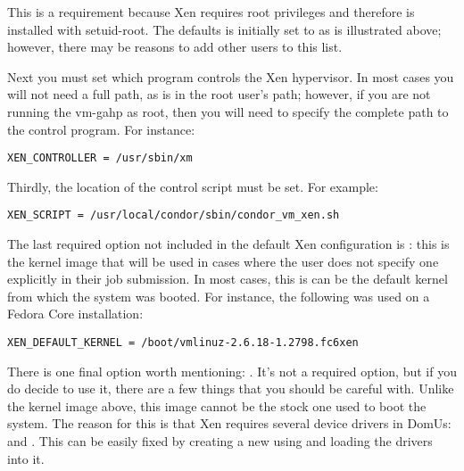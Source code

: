 This is a requirement because Xen requires root privileges and therefore
 is installed with setuid-root.  The defaults is initially 
set to  as is illustrated above; however, there may be reasons
to add other users to this list.

Next you must set which program controls the Xen hypervisor.  In most cases 
you will not need a full path, as  is in the root user's 
path; however, if you are not running the vm-gahp as root, then you will need 
to specify the complete path to the control program.  For instance:

\begin{verbatim}
XEN_CONTROLLER = /usr/sbin/xm
\end{verbatim}

Thirdly, the location of the control script must be set.  For example:

\begin{verbatim}
XEN_SCRIPT = /usr/local/condor/sbin/condor_vm_xen.sh
\end{verbatim}

The last required option not included in the default Xen configuration is
: this is the kernel image that will be used
in cases where the user does not specify one explicitly in their job
submission.  In most cases, this is can be the default kernel from which
the system was booted.  For instance, the following was used on a Fedora
Core installation:

\begin{verbatim}
XEN_DEFAULT_KERNEL = /boot/vmlinuz-2.6.18-1.2798.fc6xen
\end{verbatim}

There is one final option worth mentioning: .  
It's not a required option, but if you do decide to use it, there are a 
few things that you should be careful with.  Unlike the kernel image above,
this image cannot be the stock one used to boot the system.  The reason
for this is that Xen requires several device drivers in DomUs:  
and .  This can be easily fixed by creating a new 
using  and loading the drivers into it.


